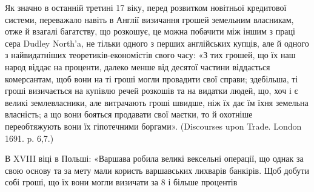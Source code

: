 Як значно в останній третині 17 віку, перед розвитком новітньої кредитової
системи, переважало навіть в Англії визичання грошей земельним
власникам, отже й взагалі багатству, що розкошує, це можна побачити між
іншим з праці сера Dudley North’a, не тільки одного з перших англійських
купців, але й одного з найвидатніших теоретиків-економістів свого часу: «З тих
грошей, що їх наш народ віддає на проценти, далеко менше від десятої частини
віддається комерсантам, щоб вони на ті гроші могли провадити свої справи;
здебільша, ті гроші визичається на купівлю речей розкошів та на видатки людей,
що, хоч і є великі землевласники, але витрачають гроші швидше, ніж їх дає
їм їхня земельна власність; а що вони бояться продавати свої маєтки, то
й охотніше переобтяжують вони їх гіпотечними боргами». (Discourses upon Trade.
London 1691. p. 6,7.)

В XVIII віці в Польші: «Варшава робила великі вексельні операції, що
однак за свою основу та за мету мали користь варшавських лихварів банкірів.
Щоб добути собі гроші, що їх вони могли визичати за 8 і більше процентів
\parbreak{}  %
